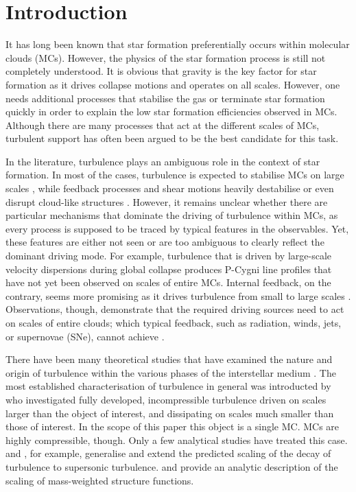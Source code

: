 \section{Introduction}\label{intro}

It has long been known that star formation preferentially occurs within molecular clouds (MCs). 
However, the physics of the star formation process is still not completely understood.
It is obvious that gravity is the key factor for star formation as it drives collapse motions and operates on all scales.
However, one needs additional processes that stabilise the gas or terminate star formation quickly in order to explain the low star formation efficiencies observed in MCs. 
Although there are many processes that act at the different scales of MCs, turbulent support has often been argued to be the best candidate for this task.

In the literature, turbulence plays an ambiguous role in the context of star formation. 
In most of the cases, turbulence is expected to stabilise MCs on large scales \citep{Fleck1980,McKee1992,MacLow2003}, while feedback processes and shear motions heavily destabilise or even disrupt cloud-like structures \citep{Tan2013,Miyamoto2014}. 
However, it remains unclear whether there are particular mechanisms that dominate the driving of turbulence within MCs, as every process is supposed to be traced by typical features in the observables.
Yet, these features are either not seen or are too ambiguous to clearly reflect the dominant driving mode.
For example, turbulence that is driven by large-scale velocity dispersions during global collapse \citep{Ballesteros2011a,Ballesteros2011b,Hartmann2012} produces P-Cygni line profiles that have not yet been observed on scales of entire MCs. 
Internal feedback, on the contrary, seems more promising as it drives turbulence from small to large scales \citep{Dekel2013,Krumholz2014}.
Observations, though, demonstrate that the required driving sources need to act on scales of entire clouds; which typical feedback, such as radiation, winds, jets, or supernovae (SNe), cannot achieve \citep{Heyer2004,Brunt2009,Brunt2013}.

There have been many theoretical studies that have examined the nature and origin of turbulence within the various phases of the interstellar medium \citep[ISM;][and references within]{MacLow2004}. 
The most established characterisation of turbulence in general was introducted by \citet{Kolmogorov1941} who investigated fully developed, incompressible turbulence driven on scales larger than the object of interest, and dissipating on scales much smaller than those of interest.
In the scope of this paper this object is a single MC. 
MCs are highly compressible, though.
Only a few analytical studies have treated this case.
\citet{She1994} and \citet{Boldyrev2002}, for example, generalise and extend the predicted scaling of the decay of turbulence to supersonic turbulence.
\citet{Galtier2011} and \citet{Banerjee2013} provide an analytic description of the scaling of mass-weighted structure functions.

